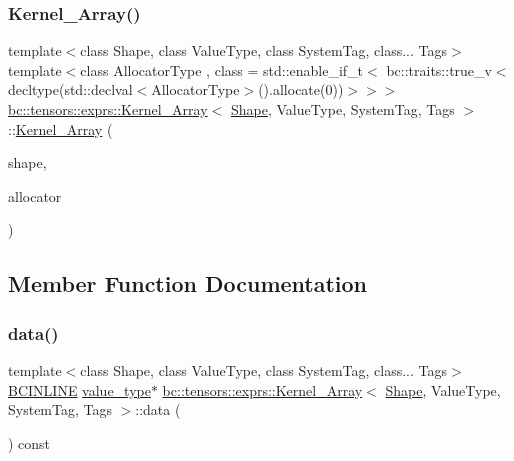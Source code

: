 \subsubsection{\texorpdfstring{Kernel\+\_\+\+Array()}{Kernel\_Array()}\hspace{0.1cm}{\footnotesize\ttfamily [3/3]}}
{\footnotesize\ttfamily template$<$class Shape, class Value\+Type, class System\+Tag, class... Tags$>$ \\
template$<$class Allocator\+Type , class  = std\+::enable\+\_\+if\+\_\+t$<$				bc\+::traits\+::true\+\_\+v$<$						decltype(std\+::declval$<$\+Allocator\+Type$>$().\+allocate(0))$>$$>$$>$ \\
\hyperlink{structbc_1_1tensors_1_1exprs_1_1Kernel__Array}{bc\+::tensors\+::exprs\+::\+Kernel\+\_\+\+Array}$<$ \hyperlink{structbc_1_1Shape}{Shape}, Value\+Type, System\+Tag, Tags $>$\+::\hyperlink{structbc_1_1tensors_1_1exprs_1_1Kernel__Array}{Kernel\+\_\+\+Array} (\begin{DoxyParamCaption}\item[{\hyperlink{structbc_1_1tensors_1_1exprs_1_1Kernel__Array_ae6a4db456a47818cda06bb76d05a3b6e}{shape\+\_\+type}}]{shape,  }\item[{Allocator\+Type}]{allocator }\end{DoxyParamCaption})\hspace{0.3cm}{\ttfamily [inline]}}



\subsection{Member Function Documentation}
\mbox{\label{structbc_1_1tensors_1_1exprs_1_1Kernel__Array_a6d9defe5c32be9ebd98ea024e7b748a7}} 
\subsubsection{\texorpdfstring{data()}{data()}}
{\footnotesize\ttfamily template$<$class Shape, class Value\+Type, class System\+Tag, class... Tags$>$ \\
\hyperlink{common_8h_a6699e8b0449da5c0fafb878e59c1d4b1}{B\+C\+I\+N\+L\+I\+NE} \hyperlink{structbc_1_1tensors_1_1exprs_1_1Kernel__Array_ae8195ebc960dd40b6c731a269c00e37b}{value\+\_\+type}$\ast$ \hyperlink{structbc_1_1tensors_1_1exprs_1_1Kernel__Array}{bc\+::tensors\+::exprs\+::\+Kernel\+\_\+\+Array}$<$ \hyperlink{structbc_1_1Shape}{Shape}, Value\+Type, System\+Tag, Tags $>$\+::data (\begin{DoxyParamCaption}{ }\end{DoxyParamCaption}) const\hspace{0.3cm}{\ttfamily [inline]}}

